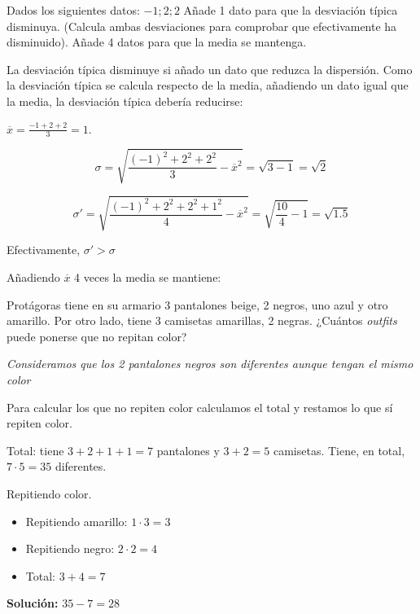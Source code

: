 \documentclass[palatino,nosec,nochap]{Docencia}
\begin{document}
\begin{problem}
Dados los siguientes datos:  $-1;2;2$
\ppart Añade 1 dato para que la desviación típica disminuya. (Calcula ambas desviaciones para comprobar que efectivamente ha disminuido).
\ppart Añade 4 datos para que la media se mantenga.

\solution

\spart La desviación típica disminuye si añado un dato que reduzca la dispersión. Como la desviación típica se calcula respecto de la media, añadiendo un dato igual que la media, la desviación típica debería reducirse:

$\overline{x} = \frac{-1+2+2}{3} = 1$.

\[ \sigma = \sqrt{\frac{(-1)^2+2^2+2^2}{3} - \overline{x}^2 }= \sqrt{3-1} = \sqrt{2}\]


\[ \sigma' = \sqrt{\frac{(-1)^2+2^2+2^2+1^2}{4} - \overline{x}^2 }= \sqrt{\frac{10}{4}-1} = \sqrt{1.5}\]

Efectivamente, $\sigma' > \sigma$

\spart  Añadiendo $\overline{x}$ 4 veces la media se mantiene:

\end{problem}

\begin{problem}
Protágoras tiene en su armario 3 pantalones beige, 2 negros, uno azul y otro amarillo. Por otro lado, tiene 3 camisetas amarillas, 2 negras. ¿Cuántos \textit{outfits} puede ponerse que no repitan color?

\solution

\textit{Consideramos que los 2 pantalones negros son diferentes aunque tengan el mismo color}


Para calcular los que no repiten color calculamos el total y restamos lo que sí repiten color.

Total: tiene $3+2+1+1 = 7$ pantalones y $3+2 = 5$ camisetas. Tiene, en total, $7·5=35$ diferentes.

Repitiendo color. 
\begin{itemize}
	\item Repitiendo amarillo: $1·3=3$
	\item Repitiendo negro: $2·2=4$
	\item Total: $3+4=7$
\end{itemize}

\textbf{Solución: } $35-7=28$

\end{problem}
\end{document}
